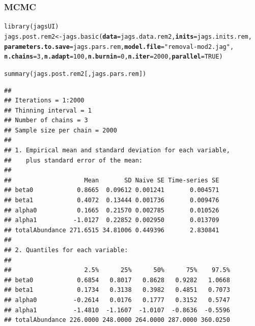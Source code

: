 \documentclass[color=usenames,dvipsnames]{beamer}\usepackage[]{graphicx}\usepackage[]{color}
\makeatletter
\newcommand{\hlnum}[1]{\textcolor[rgb]{0.69,0.494,0}{#1}}%
\newcommand{\hlstr}[1]{\textcolor[rgb]{0.749,0.012,0.012}{#1}}%
\newcommand{\hlstd}[1]{\textcolor[rgb]{0,0,0}{#1}}%
\newcommand{\hlkwb}[1]{\textcolor[rgb]{0,0.341,0.682}{#1}}%
\newcommand{\hlkwc}[1]{\textcolor[rgb]{0,0,0}{\textbf{#1}}}%
\newcommand{\hlkwd}[1]{\textcolor[rgb]{0.004,0.004,0.506}{#1}}%
\newenvironment{kframe}{%
 \def\at@end@of@kframe{}%
 \ifinner\ifhmode%
  \def\at@end@of@kframe{\end{minipage}}%
  \begin{minipage}{\columnwidth}%
 \fi\fi%
 \def\FrameCommand##1{\hskip\@totalleftmargin \hskip-\fboxsep
 \colorbox{shadecolor}{##1}\hskip-\fboxsep
     \hskip-\linewidth \hskip-\@totalleftmargin \hskip\columnwidth}%
 \MakeFramed {\advance\hsize-\width
   \@totalleftmargin\z@ \linewidth\hsize
   \@setminipage}}%
 {\par\unskip\endMakeFramed%
 \at@end@of@kframe}
\newenvironment{knitrout}{}{} %
\makeatother
\begin{document}
\begin{frame}[fragile]
  \frametitle{MCMC}
  \small
\begin{knitrout}\tiny
{}\color{fgcolor}\begin{kframe}
\begin{alltt}
\hlkwd{library}\hlstd{(jagsUI)}
\hlstd{jags.post.rem2} \hlkwb{<-} \hlkwd{jags.basic}\hlstd{(}\hlkwc{data}\hlstd{=jags.data.rem2,} \hlkwc{inits}\hlstd{=jags.inits.rem,}
                             \hlkwc{parameters.to.save}\hlstd{=jags.pars.rem,} \hlkwc{model.file}\hlstd{=}\hlstr{"removal-mod2.jag"}\hlstd{,}
                             \hlkwc{n.chains}\hlstd{=}\hlnum{3}\hlstd{,} \hlkwc{n.adapt}\hlstd{=}\hlnum{100}\hlstd{,} \hlkwc{n.burnin}\hlstd{=}\hlnum{0}\hlstd{,} \hlkwc{n.iter}\hlstd{=}\hlnum{2000}\hlstd{,} \hlkwc{parallel}\hlstd{=}\hlnum{TRUE}\hlstd{)}
\end{alltt}
\end{kframe}
\end{knitrout}

\pause

\begin{knitrout}\tiny
{}\color{fgcolor}\begin{kframe}
\begin{alltt}
\hlkwd{summary}\hlstd{(jags.post.rem2[,jags.pars.rem])}
\end{alltt}
\begin{verbatim}
## 
## Iterations = 1:2000
## Thinning interval = 1 
## Number of chains = 3 
## Sample size per chain = 2000 
## 
## 1. Empirical mean and standard deviation for each variable,
##    plus standard error of the mean:
## 
##                    Mean       SD Naive SE Time-series SE
## beta0            0.8665  0.09612 0.001241       0.004571
## beta1            0.4072  0.13444 0.001736       0.009476
## alpha0           0.1665  0.21570 0.002785       0.010526
## alpha1          -1.0127  0.22852 0.002950       0.013709
## totalAbundance 271.6515 34.81006 0.449396       2.830841
## 
## 2. Quantiles for each variable:
## 
##                    2.5%      25%      50%      75%    97.5%
## beta0            0.6854   0.8017   0.8628   0.9282   1.0668
## beta1            0.1734   0.3138   0.3982   0.4851   0.7073
## alpha0          -0.2614   0.0176   0.1777   0.3152   0.5747
## alpha1          -1.4810  -1.1607  -1.0107  -0.8636  -0.5596
## totalAbundance 226.0000 248.0000 264.0000 287.0000 360.0250
\end{verbatim}
\end{kframe}
\end{knitrout}
\end{frame}
\end{document}

